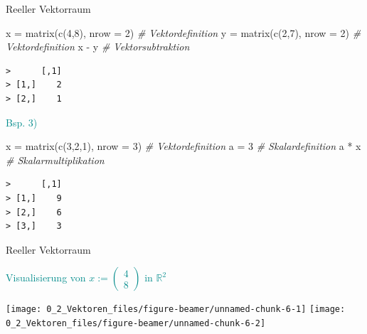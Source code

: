 \documentclass[
  8pt,
  ignorenonframetext,
]{beamer}
\newenvironment{Shaded}{\begin{snugshade}}{\end{snugshade}}
\newcommand{\AttributeTok}[1]{\textcolor[rgb]{0.77,0.63,0.00}{#1}}
\newcommand{\CommentTok}[1]{\textcolor[rgb]{0.56,0.35,0.01}{\textit{#1}}}
\newcommand{\DecValTok}[1]{\textcolor[rgb]{0.00,0.00,0.81}{#1}}
\newcommand{\FunctionTok}[1]{\textcolor[rgb]{0.00,0.00,0.00}{#1}}
\newcommand{\NormalTok}[1]{#1}
\newcommand{\OtherTok}[1]{\textcolor[rgb]{0.56,0.35,0.01}{#1}}
\newcommand{\SpecialCharTok}[1]{\textcolor[rgb]{0.00,0.00,0.00}{#1}}
\begin{document}
\begin{frame}[fragile]{Reeller Vektorraum}
\begin{Shaded}
\begin{Highlighting}[]
\NormalTok{x }\OtherTok{=} \FunctionTok{matrix}\NormalTok{(}\FunctionTok{c}\NormalTok{(}\DecValTok{4}\NormalTok{,}\DecValTok{8}\NormalTok{), }\AttributeTok{nrow =} \DecValTok{2}\NormalTok{)  }\CommentTok{\# Vektordefinition}
\NormalTok{y }\OtherTok{=} \FunctionTok{matrix}\NormalTok{(}\FunctionTok{c}\NormalTok{(}\DecValTok{2}\NormalTok{,}\DecValTok{7}\NormalTok{), }\AttributeTok{nrow =} \DecValTok{2}\NormalTok{)  }\CommentTok{\# Vektordefinition}
\NormalTok{x }\SpecialCharTok{{-}}\NormalTok{ y                         }\CommentTok{\# Vektorsubtraktion}
\end{Highlighting}
\end{Shaded}

\begin{verbatim}
>      [,1]
> [1,]    2
> [2,]    1
\end{verbatim}

\footnotesize

\textcolor{darkcyan}{Bsp. 3)} \tiny

\begin{Shaded}
\begin{Highlighting}[]
\NormalTok{x }\OtherTok{=} \FunctionTok{matrix}\NormalTok{(}\FunctionTok{c}\NormalTok{(}\DecValTok{3}\NormalTok{,}\DecValTok{2}\NormalTok{,}\DecValTok{1}\NormalTok{), }\AttributeTok{nrow =} \DecValTok{3}\NormalTok{)  }\CommentTok{\# Vektordefinition}
\NormalTok{a }\OtherTok{=} \DecValTok{3}                           \CommentTok{\# Skalardefinition}
\NormalTok{a }\SpecialCharTok{*}\NormalTok{ x                           }\CommentTok{\# Skalarmultiplikation}
\end{Highlighting}
\end{Shaded}

\begin{verbatim}
>      [,1]
> [1,]    9
> [2,]    6
> [3,]    3
\end{verbatim}
\end{frame}

\begin{frame}{Reeller Vektorraum}
\protect\hypertarget{reeller-vektorraum-5}{}
\vspace{3mm}

\textcolor{darkcyan}{Visualisierung von $x:= \begin{pmatrix}4\\8\end{pmatrix}$ in $\mathbb{R}^2$}
\vspace{9pt}

\begin{center}\texttt{[image: 0\_2\_Vektoren\_files/figure-beamer/unnamed-chunk-6-1]} \texttt{[image: 0\_2\_Vektoren\_files/figure-beamer/unnamed-chunk-6-2]} \end{center}
\end{frame}
\end{document}
